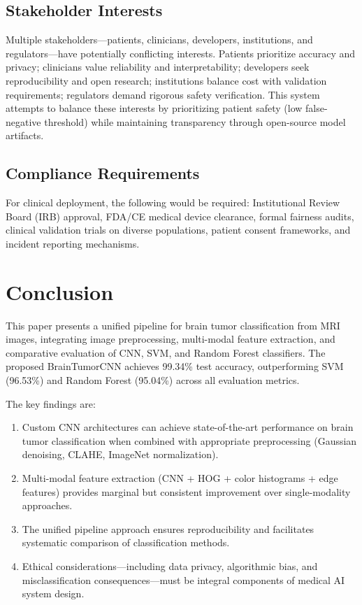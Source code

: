 \documentclass[conference]{IEEEtran}
\begin{document}
\subsection{Stakeholder Interests}
Multiple stakeholders---patients, clinicians, developers, institutions, and regulators---have potentially conflicting interests. Patients prioritize accuracy and privacy; clinicians value reliability and interpretability; developers seek reproducibility and open research; institutions balance cost with validation requirements; regulators demand rigorous safety verification. This system attempts to balance these interests by prioritizing patient safety (low false-negative threshold) while maintaining transparency through open-source model artifacts.

\subsection{Compliance Requirements}
For clinical deployment, the following would be required: Institutional Review Board (IRB) approval, FDA/CE medical device clearance, formal fairness audits, clinical validation trials on diverse populations, patient consent frameworks, and incident reporting mechanisms.


\section{Conclusion}
\label{sec:conclusion}

This paper presents a unified pipeline for brain tumor classification from MRI images, integrating image preprocessing, multi-modal feature extraction, and comparative evaluation of CNN, SVM, and Random Forest classifiers. The proposed BrainTumorCNN achieves 99.34\% test accuracy, outperforming SVM (96.53\%) and Random Forest (95.04\%) across all evaluation metrics.

The key findings are:
\begin{enumerate}
    \item Custom CNN architectures can achieve state-of-the-art performance on brain tumor classification when combined with appropriate preprocessing (Gaussian denoising, CLAHE, ImageNet normalization).
    \item Multi-modal feature extraction (CNN + HOG + color histograms + edge features) provides marginal but consistent improvement over single-modality approaches.
    \item The unified pipeline approach ensures reproducibility and facilitates systematic comparison of classification methods.
    \item Ethical considerations---including data privacy, algorithmic bias, and misclassification consequences---must be integral components of medical AI system design.
\end{enumerate}
\end{document}
